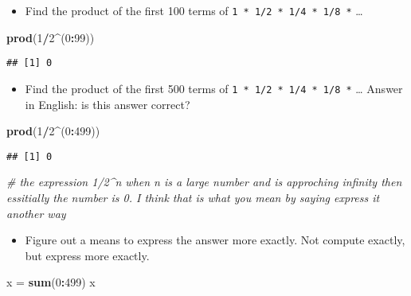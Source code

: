 \documentclass[]{article}
\newenvironment{Shaded}{\begin{snugshade}}{\end{snugshade}}
\newcommand{\KeywordTok}[1]{\textcolor[rgb]{0.13,0.29,0.53}{\textbf{#1}}}
\newcommand{\DecValTok}[1]{\textcolor[rgb]{0.00,0.00,0.81}{#1}}
\newcommand{\StringTok}[1]{\textcolor[rgb]{0.31,0.60,0.02}{#1}}
\newcommand{\CommentTok}[1]{\textcolor[rgb]{0.56,0.35,0.01}{\textit{#1}}}
\newcommand{\OperatorTok}[1]{\textcolor[rgb]{0.81,0.36,0.00}{\textbf{#1}}}
\newcommand{\NormalTok}[1]{#1}
\providecommand{\tightlist}{%
  \setlength{\itemsep}{0pt}\setlength{\parskip}{0pt}}
\begin{document}
\begin{itemize}
\tightlist
\item
  Find the product of the first 100 terms of
  \texttt{1\ *\ 1/2\ *\ 1/4\ *\ 1/8\ *} \ldots{}
\end{itemize}

\begin{Shaded}
\begin{Highlighting}[]
\KeywordTok{prod}\NormalTok{(}\DecValTok{1}\OperatorTok{/}\DecValTok{2}\OperatorTok{^}\NormalTok{(}\DecValTok{0}\OperatorTok{:}\DecValTok{99}\NormalTok{))}
\end{Highlighting}
\end{Shaded}

\begin{verbatim}
## [1] 0
\end{verbatim}

\begin{itemize}
\tightlist
\item
  Find the product of the first 500 terms of
  \texttt{1\ *\ 1/2\ *\ 1/4\ *\ 1/8\ *} \ldots{} Answer in English: is
  this answer correct?
\end{itemize}

\begin{Shaded}
\begin{Highlighting}[]
\KeywordTok{prod}\NormalTok{(}\DecValTok{1}\OperatorTok{/}\DecValTok{2}\OperatorTok{^}\NormalTok{(}\DecValTok{0}\OperatorTok{:}\DecValTok{499}\NormalTok{))}
\end{Highlighting}
\end{Shaded}

\begin{verbatim}
## [1] 0
\end{verbatim}

\begin{Shaded}
\begin{Highlighting}[]
\CommentTok{# the expression 1/2^n when n is a large number and is approching infinity then essitially the number is 0. I think that is what you mean by saying express it another way}
\end{Highlighting}
\end{Shaded}

\begin{itemize}
\tightlist
\item
  Figure out a means to express the answer more exactly. Not compute
  exactly, but express more exactly.
\end{itemize}

\begin{Shaded}
\begin{Highlighting}[]
\NormalTok{x =}\StringTok{ }\KeywordTok{sum}\NormalTok{(}\DecValTok{0}\OperatorTok{:}\DecValTok{499}\NormalTok{)}
\NormalTok{x}
\end{Highlighting}
\end{Shaded}
\end{document}
